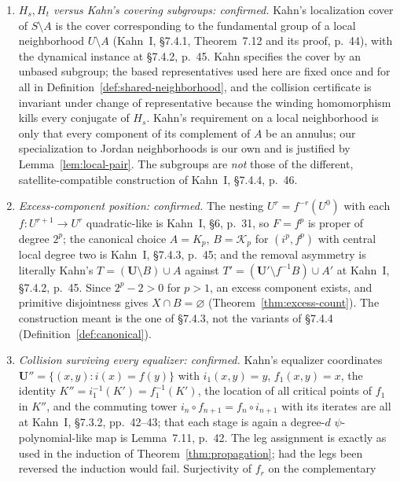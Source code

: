 \documentclass[11pt,reqno]{amsart}
\theoremstyle{definition}
\theoremstyle{remark}
\begin{document}
\begin{enumerate}
\item[(V1)] \emph{$H_{s},H_{t}$ versus Kahn's covering subgroups:
  confirmed.}  Kahn's localization cover of $S\setminus A$ is the cover
  corresponding to the fundamental group of a local neighborhood
  $U\setminus A$ (Kahn~I, \S7.4.1, Theorem~7.12 and its proof, p.~44),
  with the dynamical instance at \S7.4.2, p.~45.  Kahn specifies the
  cover by an unbased subgroup; the based representatives used here are
  fixed once and for all in
  Definition~\ref{def:shared-neighborhood}, and the collision
  certificate is invariant under change of representative because the
  winding homomorphism kills every conjugate of $H_{s}$.  Kahn's
  requirement on a local neighborhood is only that every component of
  its complement of $A$ be an annulus; our specialization to Jordan
  neighborhoods is our own and is justified by
  Lemma~\ref{lem:local-pair}.  The subgroups are \emph{not} those of
  the different, satellite-compatible construction of Kahn~I, \S7.4.4,
  p.~46.
\item[(V2)] \emph{Excess-component position: confirmed.}  The nesting
  $U^{r}=f^{-r}(U^{0})$ with each $f\colon U^{r+1}\to U^{r}$
  quadratic-like is Kahn~I, \S6, p.~31, so $F=f^{p}$ is proper of
  degree $2^{p}$; the canonical choice $A=K_{p}$, $B=\mathcal K_{p}$
  for $(i^{p},f^{p})$ with central local degree two is Kahn~I,
  \S7.4.3, p.~45; and the removal asymmetry is literally Kahn's
  $T=(\mathbf U\setminus B)\cup A$ against
  $T'=(\mathbf U'\setminus f^{-1}B)\cup A'$ at Kahn~I, \S7.4.2, p.~45.
  Since $2^{p}-2>0$ for $p>1$, an excess component exists, and
  primitive disjointness gives $X\cap B=\varnothing$
  (Theorem~\ref{thm:excess-count}).  The construction meant is the one
  of \S7.4.3, not the variants of \S7.4.4 (Definition~\ref{def:canonical}).
\item[(V3)] \emph{Collision surviving every equalizer: confirmed.}
  Kahn's equalizer coordinates $\mathbf U''=\{(x,y):i(x)=f(y)\}$ with
  $i_{1}(x,y)=y$, $f_{1}(x,y)=x$, the identity
  $K''=i_{1}^{-1}(K')=f_{1}^{-1}(K')$, the location of all critical
  points of $f_{1}$ in $K''$, and the commuting tower
  $i_{n}\circ f_{n+1}=f_{n}\circ i_{n+1}$ with its iterates are all at
  Kahn~I, \S7.3.2, pp.~42--43; that each stage is again a degree-$d$
  $\psi$-polynomial-like map is Lemma~7.11, p.~42.  The leg assignment
  is exactly as used in the induction of
  Theorem~\ref{thm:propagation}; had the legs been reversed the
  induction would fail.  Surjectivity of $f_{r}$ on the complementary

\end{enumerate}
\end{document}
